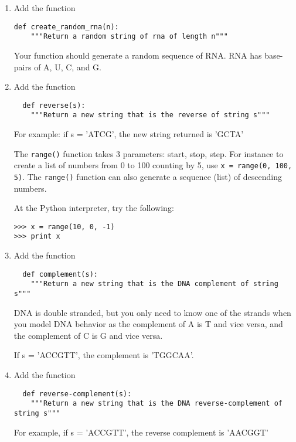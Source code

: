 \documentclass[12pt]{article}
\begin{document}
\begin{enumerate}[resume]
\item Add the function 

\begin{verbatim}
def create_random_rna(n):
    """Return a random string of rna of length n"""
\end{verbatim}
  
Your function should generate a random sequence of RNA. RNA has base-pairs of A, U, C, and G.

\item Add the function

\begin{verbatim}
  def reverse(s):
    """Return a new string that is the reverse of string s"""
\end{verbatim}

For example: if s = 'ATCG', the new string returned is 'GCTA'

The \texttt{range()} function takes 3 parameters: start, stop, step. For instance to create a list of numbers from 0 to 100 counting by 5, use \texttt{x = range(0, 100, 5)}. The \texttt{range()} function can also generate a sequence (list) of descending numbers.  

At the Python interpreter, try the following:
\begin{verbatim}
>>> x = range(10, 0, -1)
>>> print x
\end{verbatim}



\item Add the function

\begin{verbatim}
  def complement(s):
    """Return a new string that is the DNA complement of string s"""
\end{verbatim}

DNA is double stranded, but you only need to know one of the strands when you model DNA behavior as the complement of A is T and vice versa, and the complement of C is G and vice versa.

If s = 'ACCGTT', the complement is 'TGGCAA'.
\pagebreak
\item Add the function

\begin{verbatim}
  def reverse-complement(s):
    """Return a new string that is the DNA reverse-complement of string s"""
\end{verbatim}

For example, if s = 'ACCGTT', the reverse complement is 'AACGGT'


\end{enumerate}
\end{document}

